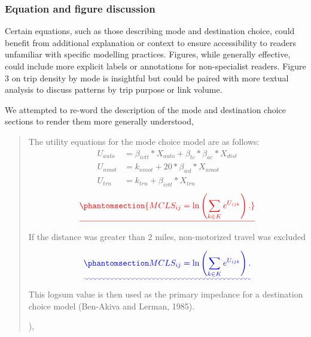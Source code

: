 \documentclass{ar2rc}
\begin{document}
\subsubsection{Equation and figure discussion}
\RC Certain equations, such as those describing mode and destination choice, could
benefit from additional explanation or context to ensure accessibility to readers
unfamiliar with specific modelling practices. Figures, while generally effective, could
include more explicit labels or annotations for non-specialist readers. Figure 3 on trip
density by mode is insightful but could be paired with more textual analysis to discuss
patterns by trip purpose or link volume.

\AR We attempted to re-word the description of the mode and destination choice
sections to render them more generally understood,

\begin{quote}
    The utility equations for the mode choice model are as follows: \[
\begin{aligned}
U_{auto} &= \beta_{ivtt} * X_{auto} + \beta_{tc} * \beta_{ac} * X_{dist}\\
U_{nmot} &= k_{nmot} + 20 * \beta_{wd}*X_{nmot}\\
U_{trn} &= k_{trn} + \beta_{ivtt} * X_{trn}
\end{aligned}
\] \DIFdelbegin {}\begin{displaymath}\DIFdel{\phantomsection%
{
MCLS_{ij} = \ln\left(\sum_{k \in K} e^{U_{ijk}}\right).
}}\end{displaymath}%
\DIFdelend If the distance was greater than 2 miles, non-motorized
travel was excluded \DIFdelbegin {}%

\DIFdelend \DIFaddbegin {}\begin{equation}\DIFadd{\phantomsection\label{eq-mcls}{
MCLS_{ij} = \ln\left(\sum_{k \in K} e^{U_{ijk}}\right).
}}\end{equation}  \DIFaddend This logsum value is then used as the primary impedance for a
destination choice model (Ben-Akiva and Lerman, 1985). 
\DIFdelbegin {}\DIFdelend \DIFaddbegin 

\DIFaddend ),
\end{quote}
\end{document}
